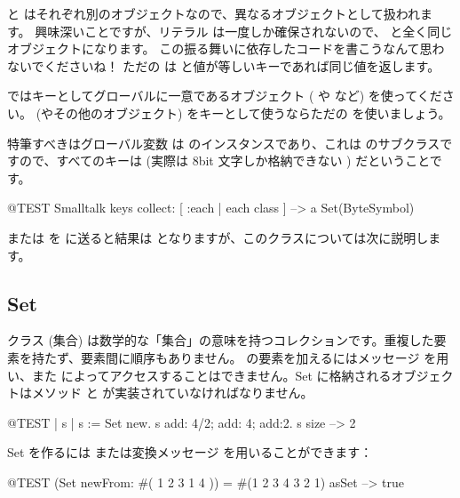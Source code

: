 \documentclass[a4paper,10pt,twoside]{book}
\begin{document}
\noindent
{} と  はそれぞれ別のオブジェクトなので、異なるオブジェクトとして扱われます。
興味深いことですが、リテラル \mbox{} は一度しか確保されないので、 と全く同じオブジェクトになります。
この振る舞いに依存したコードを書こうなんて思わないでくださいね！
ただの  は  と値が等しいキーであれば同じ値を返します。

 ではキーとしてグローバルに一意であるオブジェクト ( や  など) を使ってください。 (やその他のオブジェクト) をキーとして使うならただの  を使いましょう。

特筆すべきはグローバル変数  は  のインスタンスであり、これは  のサブクラスですので、すべてのキーは  (実際は 8bit 文字しか格納できない ) だということです。

\begin{code}{@TEST}
Smalltalk keys collect: [ :each | each class ] --> a Set(ByteSymbol)
\end{code}
\noindent
{} または  を  に送ると結果は  となりますが、このクラスについては次に説明します。

\subsection{Set}
クラス  (集合) は数学的な「集合」の意味を持つコレクションです。\ie 重複した要素を持たず、要素間に順序もありません。 の要素を加えるにはメッセージ  を用い、また  によってアクセスすることはできません。Set に格納されるオブジェクトはメソッド  と \ct{=} が実装されていなければなりません。

\begin{code}{@TEST | s | }
s := Set new.
s add: 4/2; add: 4; add:2.
s size --> 2
\end{code}

Set を作るには  または変換メッセージ  を用いることができます：

\begin{code}{@TEST}
(Set newFrom: #( 1 2 3 1 4 )) = #(1 2 3 4 3 2 1) asSet --> true
\end{code}
\end{document}
